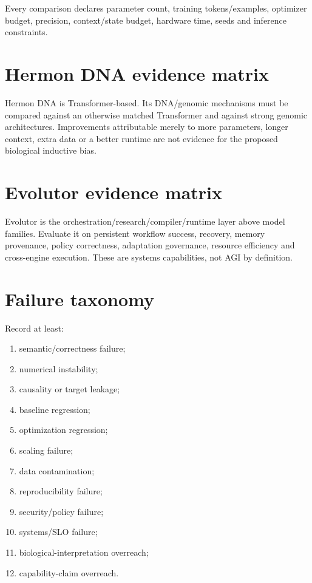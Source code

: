 
Every comparison declares parameter count, training tokens/examples, optimizer budget, precision, context/state budget, hardware time, seeds and inference constraints.

\section{Hermon DNA evidence matrix}
Hermon DNA is Transformer-based. Its DNA/genomic mechanisms must be compared against an otherwise matched Transformer and against strong genomic architectures. Improvements attributable merely to more parameters, longer context, extra data or a better runtime are not evidence for the proposed biological inductive bias.

\section{Evolutor evidence matrix}
Evolutor is the orchestration/research/compiler/runtime layer above model families. Evaluate it on persistent workflow success, recovery, memory provenance, policy correctness, adaptation governance, resource efficiency and cross-engine execution. These are systems capabilities, not AGI by definition.

\section{Failure taxonomy}
Record at least:
\begin{enumerate}
\item semantic/correctness failure;
\item numerical instability;
\item causality or target leakage;
\item baseline regression;
\item optimization regression;
\item scaling failure;
\item data contamination;
\item reproducibility failure;
\item security/policy failure;
\item systems/SLO failure;
\item biological-interpretation overreach;
\item capability-claim overreach.
\end{enumerate}

